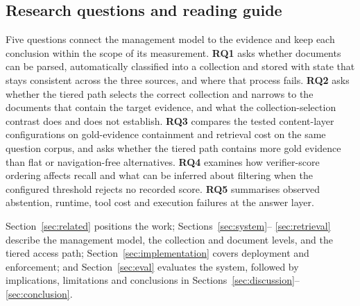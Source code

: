 \subsection{Research questions and reading guide}
\label{sec:rq}

Five questions connect the management model to the evidence and keep each
conclusion within the scope of its measurement. \textbf{RQ1} asks whether
documents can be parsed, automatically classified into a collection and stored
with state that stays consistent across the three sources, and where that
process fails. \textbf{RQ2} asks whether the tiered path selects the correct
collection and narrows to the documents that contain the target evidence, and
what the collection-selection contrast does and does not establish.
\textbf{RQ3} compares the tested content-layer configurations on
gold-evidence containment and retrieval cost on the same question corpus, and
asks whether the tiered path contains more gold evidence than
flat or navigation-free alternatives. \textbf{RQ4} examines
how verifier-score ordering affects recall and what can be inferred about
filtering when the configured threshold rejects no recorded score.
\textbf{RQ5} summarises observed abstention, runtime, tool cost and execution
failures at the answer layer.

Section~\ref{sec:related} positions the work; Sections~\ref{sec:system}--
\ref{sec:retrieval} describe the management model, the collection and
document levels, and the tiered access path;
Section~\ref{sec:implementation} covers deployment and enforcement; and
Section~\ref{sec:eval} evaluates the system, followed by implications,
limitations and conclusions in
Sections~\ref{sec:discussion}--\ref{sec:conclusion}.
